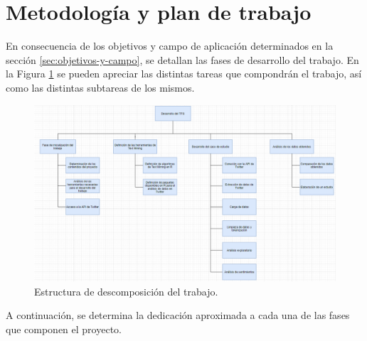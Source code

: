 \section{Metodología y plan de trabajo}
\label{sec:metodologia-y-plan}
En consecuencia de los objetivos y campo de aplicación determinados en la sección \ref{sec:objetivos-y-campo},
se detallan las fases de desarrollo del trabajo. En la Figura \ref{img:workdown-diagram} se pueden 
apreciar las distintas tareas que compondrán el trabajo, así como las distintas subtareas de los mismos.

\begin{figure}[tphb]
  \centering
  \includegraphics[width=6in]{breakdown-diagram.png}
  \caption{Estructura de descomposición del trabajo.}
  \label{img:workdown-diagram}
\end{figure}

A continuación, se determina la dedicación aproximada a cada una de las fases que componen el proyecto.


